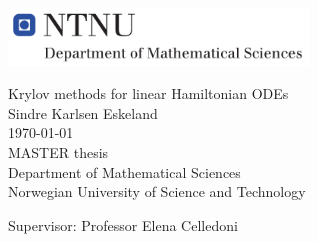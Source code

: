 
\thispagestyle{empty}
\includegraphics[height=0.6in]{fig/rams}
\mbox{}\\[6pc]
\begin{center}
\Huge{Krylov methods for linear Hamiltonian ODEs}\\[2pc]

\Large{Sindre Karlsen Eskeland}\\[1pc]
\large{\today}\\[2pc]

MASTER thesis\\
Department of Mathematical Sciences\\
Norwegian University of Science and Technology
\end{center}
\vfill

\noindent Supervisor: Professor Elena Celledoni



